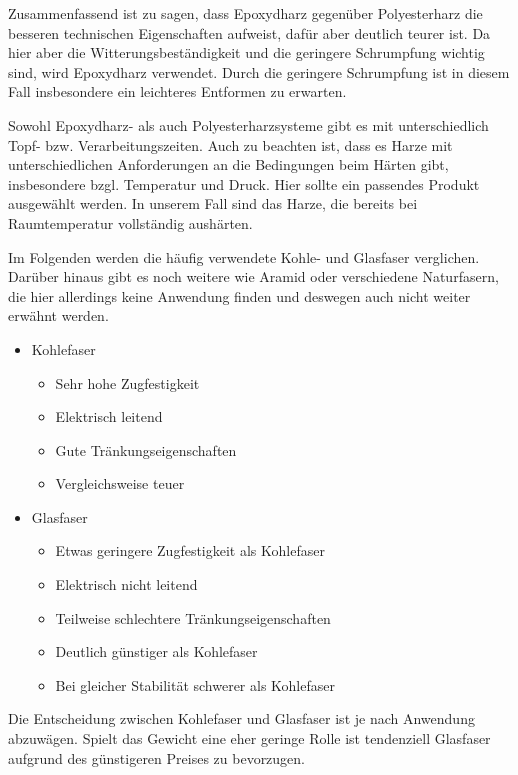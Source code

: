 \documentclass[paper=A4,pagesize,DIV=18, 12pt,listof=totoc,bibliography=totoc,headings=optiontohead,open=any]{article}
\begin{document}
Zusammenfassend ist zu sagen, dass Epoxydharz gegenüber Polyesterharz die besseren technischen Eigenschaften aufweist, dafür aber deutlich teurer ist. Da hier aber die Witterungsbeständigkeit und die geringere Schrumpfung wichtig sind, wird Epoxydharz verwendet. Durch die geringere Schrumpfung ist in diesem Fall insbesondere ein leichteres Entformen zu erwarten.

Sowohl Epoxydharz- als auch Polyesterharzsysteme gibt es mit unterschiedlich Topf- bzw. Verarbeitungszeiten. Auch zu beachten ist, dass es Harze mit unterschiedlichen Anforderungen an die Bedingungen beim Härten gibt, insbesondere bzgl. Temperatur und Druck. Hier sollte ein passendes Produkt ausgewählt werden. In unserem Fall sind das Harze, die bereits bei Raumtemperatur vollständig aushärten.

Im Folgenden werden die häufig verwendete Kohle- und Glasfaser verglichen. Darüber hinaus gibt es noch weitere wie Aramid oder verschiedene Naturfasern, die hier allerdings keine Anwendung finden und deswegen auch nicht weiter erwähnt werden.

\begin{itemize}
	\item Kohlefaser
	\begin{itemize}
		\item Sehr hohe Zugfestigkeit
		\item Elektrisch leitend
		\item Gute Tränkungseigenschaften
		\item Vergleichsweise teuer
	\end{itemize}
	\item Glasfaser
	\begin{itemize}
		\item Etwas geringere Zugfestigkeit als Kohlefaser
		\item Elektrisch nicht leitend
		\item Teilweise schlechtere Tränkungseigenschaften
		\item Deutlich günstiger als Kohlefaser
		\item Bei gleicher Stabilität schwerer als Kohlefaser
	\end{itemize}
\end{itemize}

Die Entscheidung zwischen Kohlefaser und Glasfaser ist je nach Anwendung abzuwägen. Spielt das Gewicht eine eher geringe Rolle ist tendenziell Glasfaser aufgrund des günstigeren Preises zu bevorzugen. \cite{r_g_handbuch}
\cite{r_g_wiki}
\end{document}
